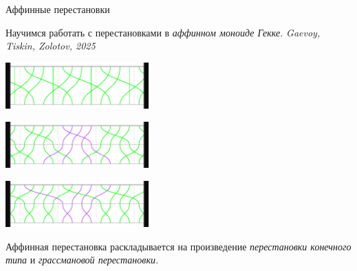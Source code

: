 \documentclass[svgnames]{beamer}
\newcommand{\flink}[1]{{\footnotesize\it\color{SkyBlue!40!White} #1}}
\begin{document}
\begin{frame}{Аффинные перестановки}
\vspace{-3mm}

Научимся работать с перестановками в {\it аффинном моноиде Гекке.}
\hfill \flink{Gaevoy, Tiskin, Zolotov, 2025}

\begin{center}
  \includegraphics[width=5.5cm]{img-fg/tP}
  
  \includegraphics[width=5.5cm]{img-fg/tP-FG}

  \includegraphics[width=5.5cm]{img-fg/tP-GF}
\end{center}

Аффинная перестановка раскладывается на произведение {\it перестановки конечного типа} и {\it грассмановой перестановки.} \vspace{2mm}

\end{frame}
\end{document}
